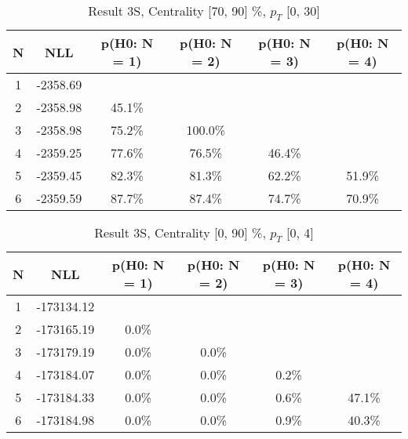 \begin{table}[htb]
	\begin{center}
	\caption{Result 3S, Centrality [70, 90] \%, $p_{T}$ [0, 30] \GeV
}
{\footnotesize\renewcommand{\arraystretch}{1.4}
		\begin{tabular}{cc||>{\columncolor[gray]{0.8}}cccc}
			N & NLL & p(H0: N = 1) & p(H0: N = 2) & p(H0: N = 3) & p(H0: N = 4)\\ 
		\hline
1 & -2358.69 & & & & \\
2 & -2358.98 & 45.1\% & & & \\
3 & -2358.98 & 75.2\% & 100.0\% & & \\
4 & -2359.25 & 77.6\% & 76.5\% & 46.4\% & \\
5 & -2359.45 & 82.3\% & 81.3\% & 62.2\% & 51.9\% \\
6 & -2359.59 & 87.7\% & 87.4\% & 74.7\% & 70.9\% \\
	\end{tabular}
		\label{tab:lab}
	}
	\end{center}\end{table}

\begin{table}[htb]
	\begin{center}
	\caption{Result 3S, Centrality [0, 90] \%, $p_{T}$ [0, 4] \GeV
}
{\footnotesize\renewcommand{\arraystretch}{1.4}
		\begin{tabular}{cc||ccc>{\columncolor[gray]{0.8}}c}
			N & NLL & p(H0: N = 1) & p(H0: N = 2) & p(H0: N = 3) & p(H0: N = 4)\\ 
		\hline
1 & -173134.12 & & & & \\
2 & -173165.19 & 0.0\% & & & \\
3 & -173179.19 & 0.0\% & 0.0\% & & \\
4 & -173184.07 & 0.0\% & 0.0\% & 0.2\% & \\
5 & -173184.33 & 0.0\% & 0.0\% & 0.6\% & 47.1\% \\
6 & -173184.98 & 0.0\% & 0.0\% & 0.9\% & 40.3\% \\
	\end{tabular}
		\label{tab:lab}
	}
	\end{center}\end{table}

